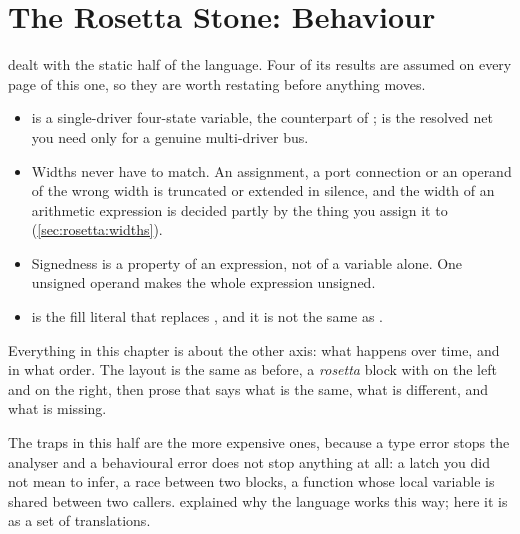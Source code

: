 \chapter{The Rosetta Stone: Behaviour}
\label{ch:rosetta2}


 dealt with the static half of the language. Four of its
results are assumed on every page of this one, so they are worth restating
before anything moves.

\begin{itemize}
  \item {} is a single-driver four-state variable, the counterpart of
        ;  is the resolved net you need only for a
        genuine multi-driver bus.
  \item Widths never have to match. An assignment, a port connection or an
        operand of the wrong width is truncated or extended in silence, and the
        width of an arithmetic expression is decided partly by the thing you
        assign it to (\cref{sec:rosetta:widths}).
  \item Signedness is a property of an expression, not of a variable alone. One
        unsigned operand makes the whole expression unsigned.
  \item {} is the fill literal that replaces , and
        it is not the same as .
\end{itemize}

Everything in this chapter is about the other axis: what happens over time,
and in what order. The layout is the same as before, a \emph{rosetta} block
with \VHDL{} on the left and \SV{} on the right, then prose that says what is
the same, what is different, and what is missing.

The traps in this half are the more expensive ones, because a type error stops
the analyser and a behavioural error does not stop anything at all: a latch you
did not mean to infer, a race between two  blocks, a function
whose local variable is shared between two callers. 
explained why the language works this way; here it is as a set of
translations.


